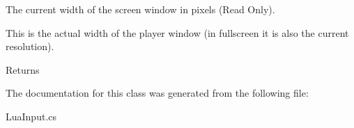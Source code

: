 The current width of the screen window in pixels (Read Only). 

This is the actual width of the player window (in fullscreen it is also the current resolution). \begin{DoxyReturn}{Returns}

\end{DoxyReturn}


The documentation for this class was generated from the following file\+:\begin{DoxyCompactItemize}
\item 
Lua\+Input.\+cs\end{DoxyCompactItemize}
